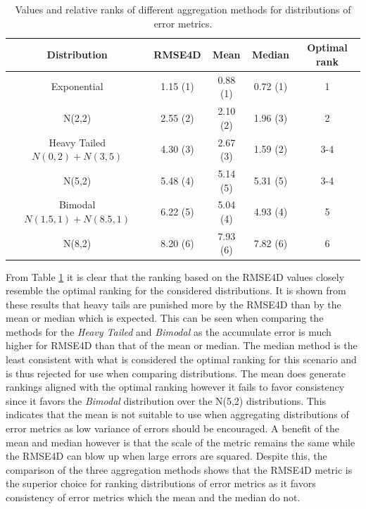 \begin{table}[htp]
  \centering
  \begin{tabular}{ccccc}
    Distribution                     & RMSE4D   & Mean     & Median   & Optimal rank \\
    \hline
    Exponential                      & 1.15 (1) & 0.88 (1) & 0.72 (1) & 1            \\
    \hline
    N(2,2)                           & 2.55 (2) & 2.10 (2) & 1.96 (3) & 2            \\
    \hline
    Heavy Tailed \(N(0,2) + N(3,5)\) & 4.30 (3) & 2.67 (3) & 1.59 (2) & 3-4          \\
    \hline
    N(5,2)                           & 5.48 (4) & 5.14 (5) & 5.31 (5) & 3-4          \\
    \hline
    Bimodal \(N(1.5,1) + N(8.5,1)\)  & 6.22 (5) & 5.04 (4) & 4.93 (4) & 5            \\ %
    \hline
    N(8,2)                           & 8.20 (6) & 7.93 (6) & 7.82 (6) & 6            \\
    \hline
  \end{tabular}
  \caption{Values and relative ranks of different aggregation methods for distributions of error metrics.}
  \label{tab:evaluation_crayon_score}
\end{table}

From Table \ref{tab:evaluation_crayon_score} it is clear that the ranking based on the RMSE4D values closely resemble the optimal ranking for the considered distributions. It is shown from these results that heavy tails are punished more by the RMSE4D than by the mean or median which is expected. This can be seen when comparing the methods for the \textit{Heavy Tailed} and \textit{Bimodal} as the accumulate error is much higher for RMSE4D than that of the mean or median. The median method is the least consistent with what is considered the optimal ranking for this scenario and is thus rejected for use when comparing distributions. The mean does generate rankings aligned with the optimal ranking however it fails to favor consistency since it favors the \textit{Bimodal} distribution over the N(5,2) distributions. This indicates that the mean is not suitable to use when aggregating distributions of error metrics as low variance of errors should be encouraged. A benefit of the mean and median however is that the scale of the metric remains the same while the RMSE4D can blow up when large errors are squared. Despite this, the comparison of the three aggregation methods shows that the RMSE4D metric is the superior choice for ranking distributions of error metrics as it favors consistency of error metrics which the mean and the median do not.

